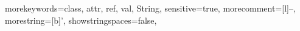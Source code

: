 {morekeywords={class, attr, ref, val, String},
sensitive=true,
morecomment=[l]{--},
morestring=[b]',
showstringspaces=false,
}